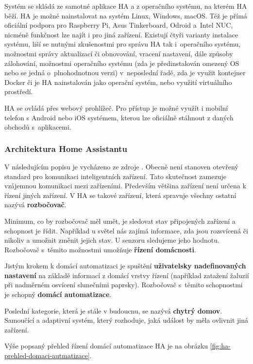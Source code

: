 Systém se skládá ze samotné aplikace HA a z operačního systému, na kterém HA běží. HA je možné nainstalovat na systém Linux, Windows, macOS. Též je přímá oficiální podpora pro Raspberry Pi, Asus Tinkerboard, Odroid a~Intel NUC, nicméně funkčnost lze najít i pro jiná zařízení. Existují čtyři varianty instalace systému, liší se nutnými zkušenostmi pro správu HA tak i~operačního systému, možnostmi správy aktualizací či obnovování, vracení nastavení, dále způsoby zálohování, možnostmi operačního systému (zda je předinstalován omezený OS nebo se jedná o~plnohodnotnou verzi) v~neposlední řadě, zda je využit kontejner Docker či je HA nainstalován jako operační systém, nebo využití virtuálního prostředí.

HA se ovládá přes webový prohlížeč. Pro přístup je možné využít i mobilní telefon s Android nebo iOS systémem, kterou lze oficiálně stáhnout z daných obchodů s~aplikacemi.

\subsubsection{Architektura Home Assistantu}
V následujícím popisu je vycházeno ze zdroje \cite{home-assistant-architektura}. Obecně není stanoven otevřený standard pro komunikaci inteligentních zařízení. Tato skutečnost zamezuje vzájemnou komunikaci mezi zařízeními. Především většina zařízení není určena k řízení jiných zařízení. V HA se takové zařízení, která spravuje všechny ostatní nazývá \textbf{rozbočovač}.

Minimum, co by rozbočovač měl umět, je sledovat stav připojených zařízení a schopnost je řídit. Například u světel nás zajímá informace, zda jsou rozsvícená či nikoliv a umožnit změnit jejich stav. U senzoru sledujeme jeho hodnotu. Rozbočovač s~těmito možnostmi umožňuje \textbf{řízení domácnosti}.

Jistým krokem k domácí automatizaci je spuštění \textbf{uživatelsky nadefinovaných nastavení} na základě informací z domácí vrstvy řízení (například zatažení žaluzií při nadměrném osvícení slunečními paprsky). Rozbočovač s~těmito schopnostmi je schopný \textbf{domácí automatizace}.

Poslední kategorie, která je stále v budoucnu, se nazývá \textbf{chytrý domov}. Samoučící a adaptivní systém, který rozhoduje, jaká událost by měla ovlivnit jiná zařízení.

Výše popsaný přehled řízení domácí automatizace HA je na obrázku \ref{fig:ha-prehled-domaci-autmatizace}.


